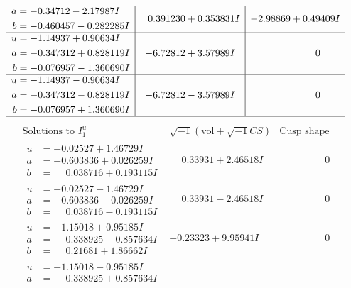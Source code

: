 \documentclass[1p]{elsarticle_modified}
\theoremstyle{definition}
\newcommand{\I}{\sqrt{-1}}
\begin{document}
$$\begin{array}{c|c|c}
\begin{aligned}
a &= -0.34712 - 2.17987 I \\
b &= -0.460457 - 0.282285 I\end{aligned}
 & \phantom{-}0.391230 + 0.353831 I & -2.98869 + 0.49409 I \\ \hline\begin{aligned}
u &= -1.14937 + 0.90634 I \\
a &= -0.347312 + 0.828119 I \\
b &= -0.076957 - 1.360690 I\end{aligned}
 & -6.72812 + 3.57989 I & \phantom{-0.000000 } 0 \\ \hline\begin{aligned}
u &= -1.14937 - 0.90634 I \\
a &= -0.347312 - 0.828119 I \\
b &= -0.076957 + 1.360690 I\end{aligned}
 & -6.72812 - 3.57989 I & \phantom{-0.000000 } 0\\
 \hline 
 \end{array}$$\newpage$$\begin{array}{c|c|c}  
\text{Solutions to }I^u_{1}& \I (\text{vol} + \sqrt{-1}CS) & \text{Cusp shape}\\
 \hline 
\begin{aligned}
u &= -0.02527 + 1.46729 I \\
a &= -0.603836 + 0.026259 I \\
b &= \phantom{-}0.038716 + 0.193115 I\end{aligned}
 & \phantom{-}0.33931 + 2.46518 I & \phantom{-0.000000 } 0 \\ \hline\begin{aligned}
u &= -0.02527 - 1.46729 I \\
a &= -0.603836 - 0.026259 I \\
b &= \phantom{-}0.038716 - 0.193115 I\end{aligned}
 & \phantom{-}0.33931 - 2.46518 I & \phantom{-0.000000 } 0 \\ \hline\begin{aligned}
u &= -1.15018 + 0.95185 I \\
a &= \phantom{-}0.338925 - 0.857634 I \\
b &= \phantom{-}0.21681 + 1.86662 I\end{aligned}
 & -0.23323 + 9.95941 I & \phantom{-0.000000 } 0 \\ \hline\begin{aligned}
u &= -1.15018 - 0.95185 I \\
a &= \phantom{-}0.338925 + 0.857634 I \\

\end{aligned}
\end{array}$$
\end{document}
